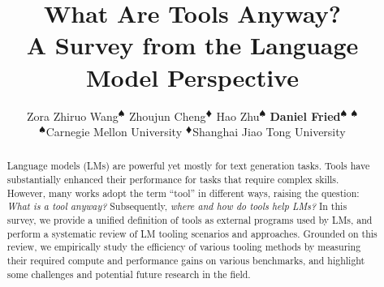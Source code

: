 \documentclass{article} %
\title{What Are Tools Anyway? \\A Survey from the Language Model Perspective}
\author{Zora Zhiruo Wang$^{\spadesuit}$ \quad Zhoujun Cheng$^{\vardiamondsuit}$ \quad Hao Zhu$^{\spadesuit}$ \quad
{\bf  Daniel Fried$^{\spadesuit}$} \quad {\bf Graham Neubig}$^{\spadesuit}$ \\
$^{\spadesuit}$Carnegie Mellon University \quad $^{\vardiamondsuit}$Shanghai Jiao Tong University}
\begin{document}
\maketitle

\begin{abstract}
Language models (LMs) are powerful yet mostly for text generation tasks. Tools have substantially enhanced their performance for tasks that require complex skills.
However, many works adopt the term ``tool'' in different ways, raising the question: \textit{What is a tool anyway?} Subsequently, \textit{where and how do tools help LMs?}
In this survey, we provide a unified definition of tools as external programs used by LMs, and perform a systematic review of LM tooling scenarios and approaches.
Grounded on this review, we empirically study the efficiency of various tooling methods by measuring their required compute and performance gains on various benchmarks, and highlight some challenges and potential future research in the field.%
\end{abstract}













\clearpage
\appendix

% 
\end{document}
